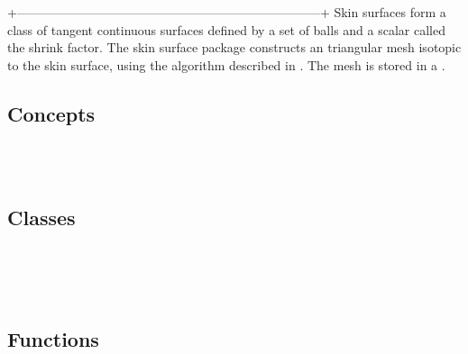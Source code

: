 
\label{chapterSkinSurfaceRef}

%
+------------------------------------------------------------------------+
Skin surfaces form a class of tangent continuous surfaces defined by a
set of balls and a scalar called the shrink factor. The skin surface
package constructs an triangular mesh isotopic to the skin surface,
using the algorithm described in \cite{cgal:kv-mssct-05}. The mesh is
stored in a .

\subsection*{Concepts}
\\
\\



\subsection*{Classes}
\\
\\

\\

\subsection*{Functions}
\\
\\


